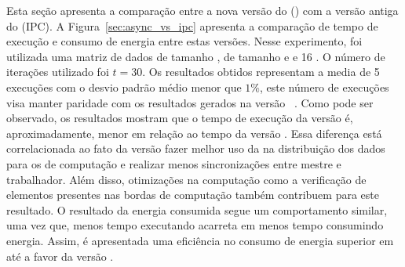 Esta seção apresenta a comparação entre a nova versão do \pskelmppa (\async) com a versão antiga do \pskelmppa (IPC). A Figura~\ref{sec:async_vs_ipc} apresenta a comparação de tempo de execução e consumo de energia entre estas versões. Nesse experimento, foi utilizada uma matriz de dados de tamanho \ind, \tiles de tamanho \tilec e \tiled e 16 \clusters. O número de iterações utilizado foi $t = 30$. Os resultados obtidos representam a media de 5 execuções com o desvio padrão médio menor que $1\%$, este número de execuções visa manter paridade com os resultados gerados na versão \ipc~\cite{Podesta:TCC}. Como pode ser observado,  os resultados mostram que o tempo de execução da versão \async é, aproximadamente,  menor em relação ao tempo da versão \ipc. Essa diferença está correlacionada ao fato da versão \async fazer melhor uso da \noc na distribuição dos dados para os \cluster de computação e realizar menos sincronizações entre mestre e trabalhador. Além disso, otimizações na computação como a verificação de elementos presentes nas bordas de computação também contribuem para este resultado.
O resultado da energia consumida segue um comportamento similar, uma vez que, menos tempo executando acarreta em menos tempo consumindo energia. Assim, é apresentada uma eficiência no consumo de energia superior em até  a favor da versão \async.

